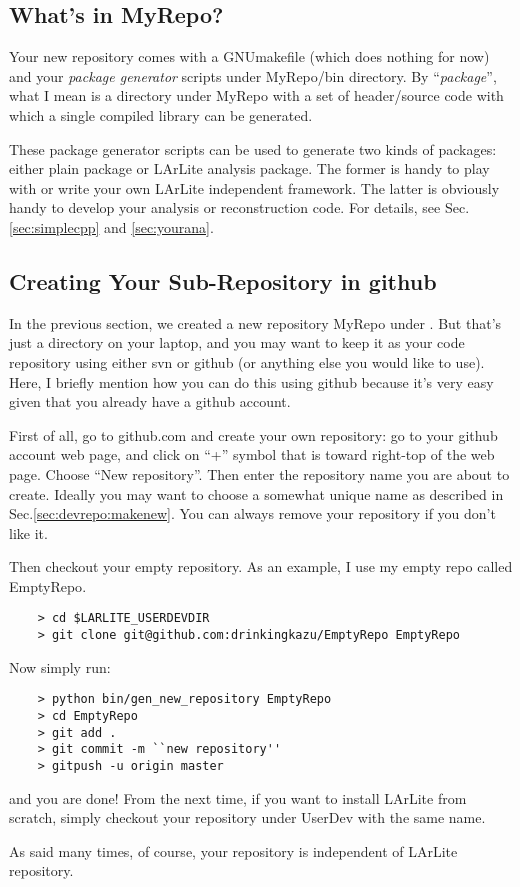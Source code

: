 \subsection{What's in MyRepo?}

Your new repository comes with a GNUmakefile (which does nothing for now) and your {\it package generator} scripts under {\ttfamily MyRepo/bin} directory. By ``{\it package}'', what I mean is a directory under {\ttfamily MyRepo} with a set of header/source code with which a single compiled library can be generated.

These package generator scripts can be used to generate two kinds of packages: either plain \CPP package or LArLite analysis package. The former is handy to play with \CPP or write your own LArLite independent framework. The latter is obviously handy to develop your analysis or reconstruction code. For details, see Sec.\ref{sec:simplecpp} and \ref{sec:yourana}.

\subsection{Creating Your Sub-Repository in {\ttfamily github}}
In the previous section, we created a new repository {\ttfamily MyRepo} under \UserDev. But that's just a directory on your laptop, and you may want to keep it as your code repository using either {\ttfamily svn} or {\ttfamily github} (or anything else you would like to use). Here, I briefly mention how you can do this using {\ttfamily github} because it's very easy given that you already have a {\ttfamily github} account.

First of all, go to {\ttfamily github.com} and create your own repository: go to your {\ttfamily github} account web page, and click on ``+'' symbol that is toward right-top of the web page. Choose ``New repository''. Then enter the repository name you are about to create. Ideally you may want to choose a somewhat unique name as described in Sec.\ref{sec:devrepo:makenew}. You can always remove your repository if you don't like it.

Then checkout your empty repository. As an example, I use my empty repo called {\ttfamily EmptyRepo}.
\begin{lstlisting}
    > cd $LARLITE_USERDEVDIR
    > git clone git@github.com:drinkingkazu/EmptyRepo EmptyRepo
\end{lstlisting}
Now simply run:
\begin{lstlisting}
    > python bin/gen_new_repository EmptyRepo
    > cd EmptyRepo
    > git add .
    > git commit -m ``new repository''
    > gitpush -u origin master
\end{lstlisting}
and you are done!
From the next time, if you want to install LArLite from scratch, simply checkout your repository under UserDev with the same name.

As said many times, of course, your repository is independent of LArLite repository.



